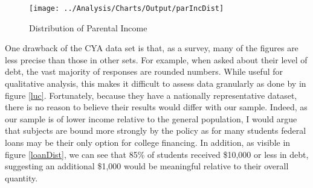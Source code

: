 \documentclass[12pt]{article}
\begin{document}
	\begin{figure}
		\centering
		\caption{Distribution of Parental Income}
		\label{incDist}
		\texttt{[image: ../Analysis/Charts/Output/parIncDist]}
	\end{figure}
	
	One drawback of the CYA data set is that, as a survey, many of the figures are less precise than those in other sets. For example, when asked about their level of debt, the vast majority of responses are rounded numbers. While useful for qualitative analysis, this makes it difficult to assess data granularly as done by \textcite{lucca2018} in figure \ref{luc}. Fortunately, because they have a nationally representative dataset, there is no reason to believe their results would differ with our sample. Indeed, as our sample is of lower income relative to the general population, I would argue that subjects are bound more strongly by the policy as for many students federal loans may be their only option for college financing. In addition, as visible in figure \ref{loanDist}, we can see that 85\% of students received \$10,000 or less in debt, suggesting an additional \$1,000 would be meaningful relative to their overall quantity. 
	
\end{document}
